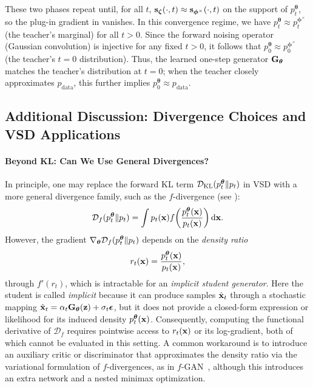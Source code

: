 These two phases repeat until, for all $t$, 
${\mathbf{s}}_{\bm{\zeta}}(\cdot,t)\approx {\mathbf{s}}_{\bm{\phi}^\times}(\cdot,t)$ on the support of $p_t^{\bm{\theta}}$,
so the plug-in gradient in  vanishes. In this convergence regime,
we have $p_t^{\bm{\theta}}\approx p_t^{\bm{\phi}^\times}$ (the teacher’s marginal) for all $t>0$.
Since the forward noising operator (Gaussian convolution) is injective for any fixed $t>0$,
it follows that $p_0^{\bm{\theta}}\approx p_0^{\bm{\phi}^\times}$ (the teacher’s $t=0$ distribution).
Thus, the learned one-step generator ${\mathbf{G}}_{\bm{\theta}}$ matches the teacher’s distribution at $t=0$;
when the teacher closely approximates $p_{\mathrm{data}}$, this further implies $p_0^{\bm{\theta}}\approx p_{\mathrm{data}}$.

\subsection{Additional Discussion: Divergence Choices and VSD Applications}\label{subsec:vsd-discussion}


\paragraph{Beyond KL: Can We Use General Divergences?}
In principle, one may replace the forward KL term
$\mathcal{D}_{\mathrm{KL}}(p_t^{{\bm{\theta}}}\|p_t)$ in VSD with a more general
divergence family, such as the  $f$-divergence (see ):
\[
\mathcal{D}_f(p_t^{{\bm{\theta}}}\|p_t)
= \int p_t({\mathbf{x}})  f\!\left(\frac{p_t^{{\bm{\theta}}}({\mathbf{x}})}{p_t({\mathbf{x}})}\right)\mathop{}\!\mathrm{d} {\mathbf{x}}.
\]
However, the gradient
$\nabla_{{\bm{\theta}}}\mathcal{D}_f(p_t^{{\bm{\theta}}}\|p_t)$ depends on the
\emph{density ratio}
\[
r_t({\mathbf{x}})=\frac{p_t^{{\bm{\theta}}}({\mathbf{x}})}{p_t({\mathbf{x}})},
\]
through $f'(r_t)$, which is intractable for an \emph{implicit student generator}.
Here the student is called \emph{implicit} because it can produce samples
$\hat{{\mathbf{x}}}_t$ through a stochastic mapping
$\hat{{\mathbf{x}}}_t=\alpha_t{\mathbf{G}}_{\bm{\theta}}({\mathbf{z}})+\sigma_t{\bm{\epsilon}}$, but it does not provide
a closed-form expression or likelihood for its induced density
$p_t^{{\bm{\theta}}}({\mathbf{x}})$.
Consequently, computing the functional derivative of $\mathcal{D}_f$
requires pointwise access to $r_t({\mathbf{x}})$ or its log-gradient, both of which
cannot be evaluated in this setting.
A common workaround is to introduce an auxiliary critic or discriminator that
approximates the density ratio via the variational formulation of
$f$-divergences, as in $f$-GAN~\citep{nowozin2016f}, although this introduces an
extra network and a nested minimax optimization.

